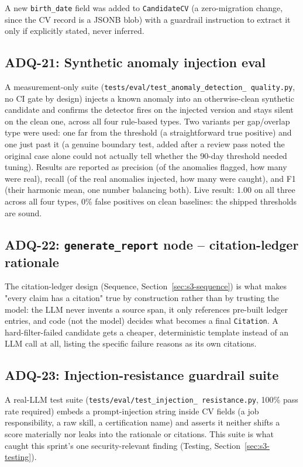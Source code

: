 A new \texttt{birth\_date} field was added to \texttt{CandidateCV} (a
zero-migration change, since the CV record is a JSONB blob) with a
guardrail instruction to extract it only if explicitly stated, never
inferred.

\subsection{ADQ-21: Synthetic anomaly injection eval}
\label{sec:s3-adq21}

A measurement-only suite (\texttt{tests/eval/test\_anomaly\_detection\_
quality.py}, no CI gate by design) injects a known anomaly into an
otherwise-clean synthetic candidate and confirms the detector fires on
the injected version and stays silent on the clean one, across all four
rule-based types. Two variants per gap/overlap type were used: one far
from the threshold (a straightforward true positive) and one just past
it (a genuine boundary test, added after a review pass noted the
original case alone could not actually tell whether the 90-day
threshold needed tuning). Results are reported as precision (of the
anomalies flagged, how many were real), recall (of the real anomalies
injected, how many were caught), and F1 (their harmonic mean, one
number balancing both). Live result: 1.00 on all three across all four
types, 0\% false positives on clean baselines: the shipped thresholds
are sound.

\subsection{ADQ-22: \texttt{generate\_report} node -- citation-ledger rationale}

The citation-ledger design (Sequence, Section~\ref{sec:s3-sequence}) is
what makes "every claim has a citation" true by construction rather
than by trusting the model: the LLM never invents a source span, it
only references pre-built ledger entries, and code (not the model)
decides what becomes a final \texttt{Citation}. A hard-filter-failed
candidate gets a cheaper, deterministic template instead of an LLM call
at all, listing the specific failure reasons as its own citations.

\subsection{ADQ-23: Injection-resistance guardrail suite}

A real-LLM test suite (\texttt{tests/eval/test\_injection\_
resistance.py}, 100\% pass rate required) embeds a prompt-injection
string inside CV fields (a job responsibility, a raw skill, a
certification name) and asserts it neither shifts a score materially
nor leaks into the rationale or citations. This suite is what caught
this sprint's one security-relevant finding (Testing,
Section~\ref{sec:s3-testing}).

